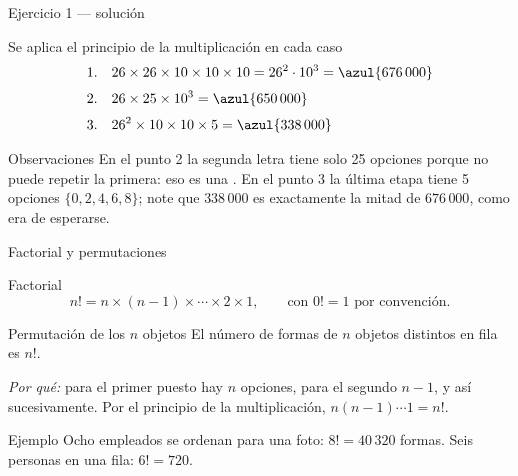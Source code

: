 \documentclass[aspectratio=169,10pt]{beamer}
\begin{document}
\begin{frame}{Ejercicio 1 — solución}
  \small
  \begin{block}{Se aplica el principio de la multiplicación en cada caso}
    \begin{align*}
      \text{1.}\quad & 26\times 26\times 10\times 10\times 10 = 26^{2}\cdot 10^{3}
                       = \azul{676\,000}\\[0.25em]
      \text{2.}\quad & 26\times 25\times 10^{3} = \azul{650\,000}\\[0.25em]
      \text{3.}\quad & 26^{2}\times 10\times 10\times 5 = \azul{338\,000}
    \end{align*}
  \end{block}

  \vspace{0.15cm}
  \begin{exampleblock}{Observaciones}
    \footnotesize
    En el punto 2 la segunda letra tiene solo 25 opciones porque no puede
    repetir la primera: eso es una . En el punto 3 la última
    etapa tiene 5 opciones $\{0,2,4,6,8\}$; note que $338\,000$ es exactamente
    la mitad de $676\,000$, como era de esperarse.
  \end{exampleblock}
\end{frame}

\begin{frame}{Factorial y permutaciones}
  \begin{block}{Factorial}
    \small
    \[ n! = n\times(n-1)\times\cdots\times 2\times 1,
       \qquad\text{con } 0!=1 \text{ por convención.} \]
  \end{block}

  \vspace{0.15cm}
  \begin{block}{Permutación de los $n$ objetos}
    \small
    El número de formas de  $n$ objetos distintos en fila es $n!$.

    \vspace{0.1cm}
    \footnotesize
    \emph{Por qué:} para el primer puesto hay $n$ opciones, para el segundo
    $n-1$, y así sucesivamente. Por el principio de la multiplicación,
    $n(n-1)\cdots 1 = n!$.
  \end{block}

  \vspace{0.15cm}
  \begin{exampleblock}{Ejemplo}
    \footnotesize
    Ocho empleados se ordenan para una foto: $8! = 40\,320$ formas.
    Seis personas en una fila: $6! = 720$.
  \end{exampleblock}
\end{frame}
\end{document}
